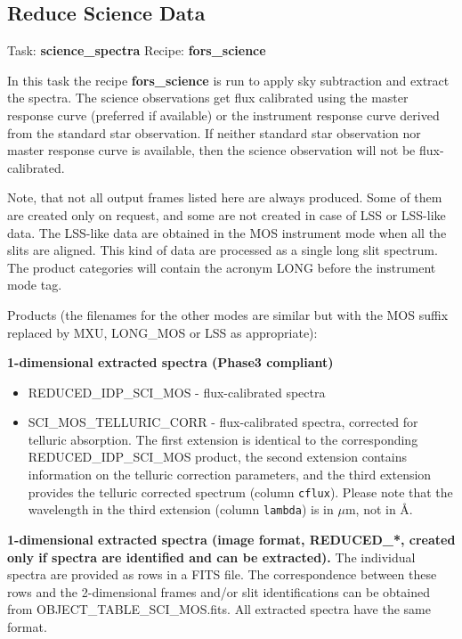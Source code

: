 \subsection{Reduce Science Data}
\label{sec:reduce_science_data}


Task: {\bf science\_spectra}   Recipe: {\bf fors\_science}


In this task the recipe {\bf fors\_science} is run to apply sky subtraction
and extract the spectra. The science observations get flux calibrated using the master response curve (preferred if available) or the instrument response curve derived from the standard star observation.
If neither standard star observation nor master response curve is available, then the science observation will not be flux-calibrated.

Note, that not all output frames listed here are always produced. Some of them are created only on request, and some are not created in case of LSS or LSS-like data. The LSS-like data are obtained in the MOS instrument mode when all the slits are aligned. This kind of data are processed as a single long slit spectrum. The product categories will contain the acronym LONG before the instrument mode tag.

Products (the filenames for the other modes are similar but with the MOS suffix replaced by MXU, LONG\_MOS or LSS as appropriate):

{\bf 1-dimensional extracted spectra (Phase3 compliant)}

\begin{itemize}
\item REDUCED\_IDP\_SCI\_MOS - flux-calibrated spectra
\item SCI\_MOS\_TELLURIC\_CORR - flux-calibrated spectra, corrected for telluric absorption. The first extension is identical to the corresponding REDUCED\_IDP\_SCI\_MOS product, the second extension contains information on the telluric correction parameters, and the
third extension provides the telluric corrected spectrum (column {\tt cflux}). Please note that the wavelength in the third extension (column {\tt lambda}) is in $\mu$m, not in Å. 

\end{itemize}

{\bf 1-dimensional extracted spectra (image format, REDUCED\_*, created only if spectra are identified and can be extracted).}
The individual spectra are provided as rows in a FITS file. The correspondence between these rows and
the 2-dimensional frames and/or slit identifications can be obtained from
OBJECT\_TABLE\_SCI\_MOS.fits. All extracted spectra have the same format.

